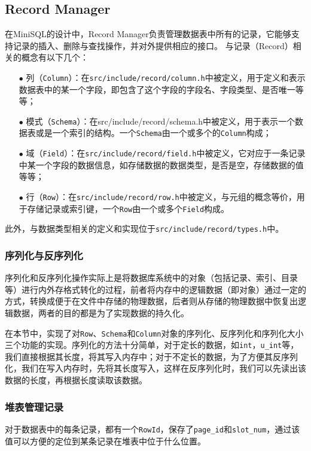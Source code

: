 \documentclass[12pt]{article}
\begin{document}
    \subsection{Record Manager}
    在MiniSQL的设计中，Record Manager负责管理数据表中所有的记录，它能够支持记录的插入、删除与查找操作，并对外提供相应的接口。
    与记录（Record）相关的概念有以下几个：
    \begin{itemize}
        \item[$\bullet$] 列（\texttt{Column}）：在\texttt{src/include/record/column.h}中被定义，用于定义和表示数据表中的某一个字段，即包含了这个字段的字段名、字段类型、是否唯一等等；
        \item[$\bullet$] 模式（\texttt{Schema}）：在src/include/record/schema.h中被定义，用于表示一个数据表或是一个索引的结构。一个\texttt{Schema}由一个或多个的\texttt{Column}构成；
        \item[$\bullet$] 域（\texttt{Field}）：在\texttt{src/include/record/field.h}中被定义，它对应于一条记录中某一个字段的数据信息，如存储数据的数据类型，是否是空，存储数据的值等等；
        \item[$\bullet$] 行（\texttt{Row}）：在\texttt{src/include/record/row.h}中被定义，与元组的概念等价，用于存储记录或索引键，一个\texttt{Row}由一个或多个\texttt{Field}构成。
    \end{itemize}
    此外，与数据类型相关的定义和实现位于\texttt{src/include/record/types.h}中。

    \subsubsection{序列化与反序列化}
    序列化和反序列化操作实际上是将数据库系统中的对象（包括记录、索引、目录等）进行内外存格式转化的过程，前者将内存中的逻辑数据（即对象）通过一定的方式，转换成便于在文件中存储的物理数据，后者则从存储的物理数据中恢复出逻辑数据，两者的目的都是为了实现数据的持久化。

    在本节中，实现了对\texttt{Row}、\texttt{Schema}和\texttt{Column}对象的序列化、反序列化和序列化大小三个功能的实现。序列化的方法十分简单，对于定长的数据，如\texttt{int}，\texttt{u\_int}等，我们直接根据其长度，将其写入内存中；对于不定长的数据，为了方便其反序列化，我们在写入内存时，先将其长度写入，这样在反序列化时，我们可以先读出该数据的长度，再根据长度读取该数据。

    \subsubsection{堆表管理记录}
    对于数据表中的每条记录，都有一个\texttt{RowId}，保存了\texttt{page\_id}和\texttt{slot\_num}，通过该值可以方便的定位到某条记录在堆表中位于什么位置。
\end{document}
